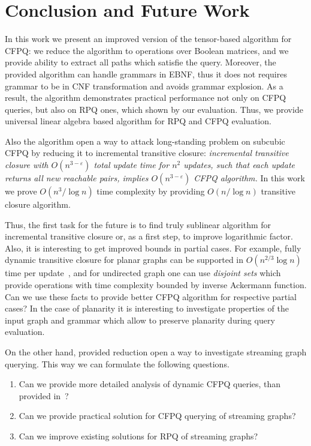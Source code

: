 \section{Conclusion and Future Work}

In this work we present an improved version of the tensor-based algorithm for CFPQ: we reduce the algorithm to operations over Boolean matrices, and we provide ability to extract all paths which satisfie the query.
Moreover, the provided algorithm can handle grammars in EBNF, thus it does not requires grammar to be in CNF transformation and avoids grammar explosion.
As a result, the algorithm demonstrates practical performance not only on CFPQ queries, but also on RPQ ones, which shown by our evaluation. 
Thus, we provide universal linear algebra based algorithm for RPQ and CFPQ evaluation.

Also the algorithm open a way to attack long-standing problem on subcubic CFPQ by reducing it to incremental transitive closure: \textit{incremental transitive closure with $O(n^{3-\varepsilon})$ total update time for $n^2$ updates, such that each update returns all new reachable pairs, implies $O(n^{3-\varepsilon})$ CFPQ algorithm.}
In this work we prove $O(n^3/\log{n})$ time complexity by providing $O(n/\log{n})$ transitive closure algorithm.

Thus, the first task for the future is to find truly sublinear algorithm for incremental transitive closure or, as a first step, to improve logarithmic factor.
Also, it is interesting to get improved bounds in partial cases.
For example, fully dynamic transitive closure for planar graphs can be supported in $O(n^{2/3}\log{n})$ time per update~\cite{10.1007/3-540-57273-2_72}, and for undirected graph one can use \textit{disjoint sets} which provide operations with time complexity bounded by inverse Ackermann function.
Can we use these facts to provide better CFPQ algorithm for respective partial cases? 
In the case of planarity it is interesting to investigate properties of the input graph and grammar which allow to preserve planarity during query evaluation.

On the other hand, provided reduction open a way to investigate streaming graph querying.
This way we can formulate the following questions.
\begin{enumerate}
\item Can we provide more detailed analysis of dynamic CFPQ queries, than provided in~\cite{10.1007/978-3-662-54458-7_16}?
\item Can we provide practical solution for CFPQ querying of streaming graphs?
\item Can we improve existing solutions for RPQ of streaming graphs?
\end{enumerate}

